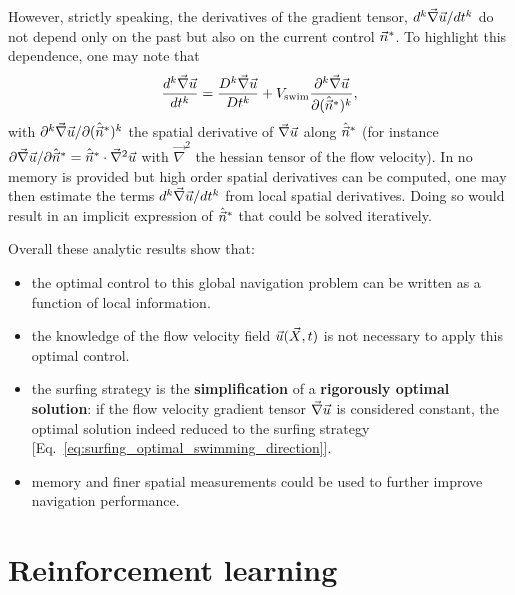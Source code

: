 However, strictly speaking, the derivatives of the gradient tensor, $d^k \vec{\nabla} \vec{u} / dt^k$ do not depend only on the past but also on the current control $\vec{n}^*$.
To highlight this dependence, one may note that
\begin{equation}\label{eq:link_to_spatial_derivatives}
	\frac{d^k \vec{\nabla} \vec{u}}{dt^k} = \frac{D^k \vec{\nabla} \vec{u}}{D t^k} + V_{\mathrm{swim}} \frac{\partial^k \vec{\nabla} \vec{u}}{\partial (\hat{\vec{n}}^* )^k},
\end{equation}
with $\partial^k \vec{\nabla} \vec{u}/\partial (\hat{\vec{n}}^*)^k$ the spatial derivative of $\vec{\nabla} \vec{u}$ along $\hat{\vec{n}}^*$ (for instance $\partial \vec{\nabla} \vec{u}/\partial \hat{\vec{n}}^* = \hat{\vec{n}}^* \cdot \vec{\nabla}^2 \vec{u}$ with $\vec{\nabla}^2$ the hessian tensor of the flow velocity).
In no memory is provided but high order spatial derivatives can be computed, one may then estimate the terms $d^k \vec{\nabla} \vec{u}/dt^k$ from local spatial derivatives.
Doing so would result in an implicit expression of $\hat{\vec{n}}^*$ that could be solved iteratively.

Overall these analytic results show that:
\begin{itemize}
	\item the optimal control to this global navigation problem can be written as a function of local information.
	\item the knowledge of the flow velocity field $\vec{u}(\vec{X}, t)$ is not necessary to apply this optimal control.
	\item the surfing strategy is the \textbf{simplification} of a \textbf{rigorously optimal solution}: if the flow velocity gradient tensor $\vec{\nabla} \vec{u}$ is considered constant, the optimal solution indeed reduced to the surfing strategy [Eq.~\eqref{eq:surfing_optimal_swimming_direction}].
	\item memory and finer spatial measurements could be used to further improve navigation performance.
\end{itemize}

\section{Reinforcement learning}

